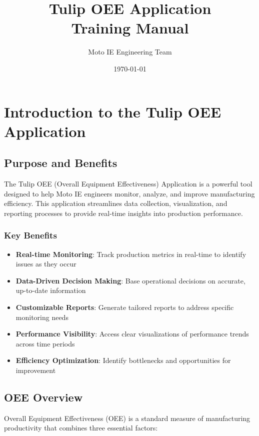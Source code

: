 \documentclass[12pt,a4paper]{report}
\title{\Huge\textbf{\textcolor{tulipblue}{Tulip OEE Application}\\[0.5cm]\Large Training Manual}}
\author{\Large Moto IE Engineering Team}
\date{\Large \today}
\begin{document}
\maketitle
\thispagestyle{empty}

\newpage
\tableofcontents
\thispagestyle{fancy}

\chapter{Introduction to the Tulip OEE Application}

\section{Purpose and Benefits}

The Tulip OEE (Overall Equipment Effectiveness) Application is a powerful tool designed to help Moto IE engineers monitor, analyze, and improve manufacturing efficiency. This application streamlines data collection, visualization, and reporting processes to provide real-time insights into production performance.

\subsection{Key Benefits}

\begin{itemize}
    \item \textbf{Real-time Monitoring}: Track production metrics in real-time to identify issues as they occur
    \item \textbf{Data-Driven Decision Making}: Base operational decisions on accurate, up-to-date information
    \item \textbf{Customizable Reports}: Generate tailored reports to address specific monitoring needs
    \item \textbf{Performance Visibility}: Access clear visualizations of performance trends across time periods
    \item \textbf{Efficiency Optimization}: Identify bottlenecks and opportunities for improvement
\end{itemize}

\section{OEE Overview}

Overall Equipment Effectiveness (OEE) is a standard measure of manufacturing productivity that combines three essential factors:
\end{document}
